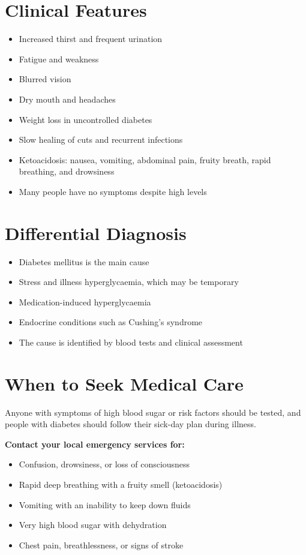 \section*{Clinical Features}
\begin{itemize}
    \item Increased thirst and frequent urination
    \item Fatigue and weakness
    \item Blurred vision
    \item Dry mouth and headaches
    \item Weight loss in uncontrolled diabetes
    \item Slow healing of cuts and recurrent infections
    \item Ketoacidosis: nausea, vomiting, abdominal pain, fruity breath, rapid breathing, and drowsiness
    \item Many people have no symptoms despite high levels
\end{itemize}

\section*{Differential Diagnosis}
\begin{itemize}
    \item Diabetes mellitus is the main cause
    \item Stress and illness hyperglycaemia, which may be temporary
    \item Medication-induced hyperglycaemia
    \item Endocrine conditions such as Cushing's syndrome
    \item The cause is identified by blood tests and clinical assessment
\end{itemize}

\section*{When to Seek Medical Care}
Anyone with symptoms of high blood sugar or risk factors should be tested, and people with diabetes should follow their sick-day plan during illness.

\textbf{Contact your local emergency services for:}
\begin{itemize}
    \item Confusion, drowsiness, or loss of consciousness
    \item Rapid deep breathing with a fruity smell (ketoacidosis)
    \item Vomiting with an inability to keep down fluids
    \item Very high blood sugar with dehydration
    \item Chest pain, breathlessness, or signs of stroke
\end{itemize}

